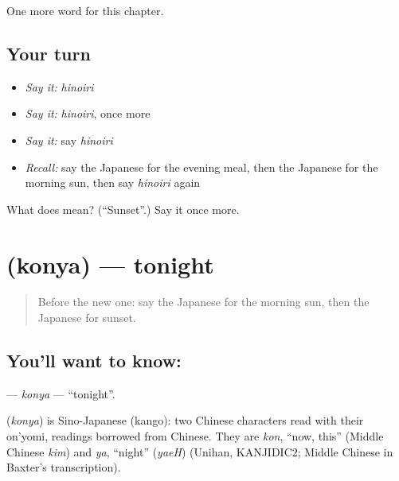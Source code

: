 \begin{grammarlens}[title={What you've built}]
One more word for this chapter.
\end{grammarlens}

\subsection*{Your turn}
\begin{itemize}
\raggedright
  \item \emph{Say it:} \emph{hinoiri}
  \item \emph{Say it:} \emph{hinoiri}, once more
  \item \emph{Say it:} say \emph{hinoiri}
  \item \emph{Recall:} say the Japanese for the evening meal, then the Japanese for the morning sun, then say \emph{hinoiri} again
\end{itemize}

\begin{tcolorbox}[breakable,colback=teal!4,colframe=teal!35!black,title={Before you move on}]
What does  mean? (\textquotedblleft{}Sunset\textquotedblright{}.) Say it once more.
\end{tcolorbox}
\section[\texorpdfstring{\ja{こんや} (konya)}{こんや (konya)}]{ (konya) — tonight}

\label{lesson:JA-C73-konya}



\begin{quote}
Before the new one: say the Japanese for the morning sun, then the Japanese for sunset.
\end{quote}

\subsection*{You'll want to know: }
\textbf{} — \emph{konya} — \textquotedblleft{}tonight\textquotedblright{}.

\begin{cousinweb}
\textbf{} (\emph{konya}) is Sino-Japanese (kango): two Chinese characters read with their on'yomi, readings borrowed from Chinese. They are \emph{kon}, \textquotedblleft{}now, this\textquotedblright{} (Middle Chinese \emph{kim}) and \emph{ya}, \textquotedblleft{}night\textquotedblright{} (\emph{yaeH}) (Unihan, KANJIDIC2; Middle Chinese in Baxter's transcription).
\end{cousinweb}

